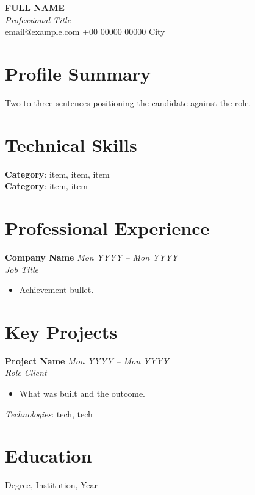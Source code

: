 \documentclass[10pt,a4paper]{article}
\begin{document}
\begin{center}
  {\huge\bfseries FULL NAME}\\[2pt]
  {\large\itshape Professional Title}\\[3pt]
  {\small email@example.com \textbullet{} +00 00000 00000 \textbullet{} City}
\end{center}

\section{Profile Summary}
Two to three sentences positioning the candidate against the role.

\section{Technical Skills}
\textbf{Category}: item, item, item\\
\textbf{Category}: item, item

\section{Professional Experience}
\textbf{Company Name} \hfill \textit{Mon YYYY -- Mon YYYY}\\
\textit{Job Title}
\begin{itemize}
  \item Achievement bullet.
\end{itemize}

\section{Key Projects}
\textbf{Project Name} \hfill \textit{Mon YYYY -- Mon YYYY}\\
\textit{Role \textbullet{} Client}
\begin{itemize}
  \item What was built and the outcome.
\end{itemize}
\textit{Technologies}: tech, tech

\section{Education}
Degree, Institution, Year
\end{document}
